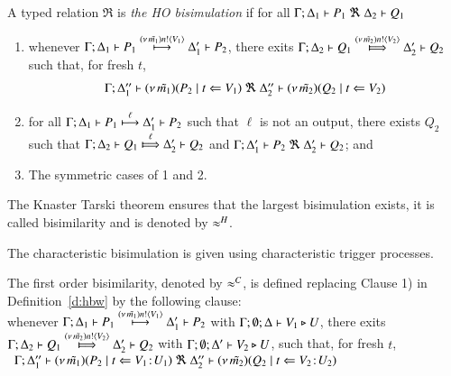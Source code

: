 \begin{definition}\rm
	\label{d:hbw}
A typed relation $\Re$ is {\em the HO bisimulation} if 
for all $\horel{\Gamma}{\Delta_1}{P_1}{\ \Re \ }{\Delta_2}{Q_1}$ 
\begin{enumerate}
\item 
whenever 
$\Gamma; \Delta_1 \vdash P_1 \stackrel{(\nu\, \tilde{m_1}) n ! \langle V_1 \rangle}{\longmapsto} \Delta_1' \vdash P_2$, there exits 
$\horel{\Gamma}{\Delta_2}{Q_1}{\Hby{\news{\tilde{m_2}} \bactout{n}{V_2}}}{\Delta_2'}{Q_2}$ such that, for fresh $t$, 
\[
\begin{array}{lrlll}
\Gamma; \Delta''_1  \vdash  {(\nu\, \tilde{m_1})(P_2 \;|\;t \Leftarrow V_1)}
\ \Re 
\ \Delta''_2 \vdash {(\nu\, \tilde{m_2})(Q_2 \;|\;t \Leftarrow V_2)}
\end{array}
\]
		\item	
for all $\Gamma; \Delta_1 \vdash P_1 \stackrel{\ell}{\longmapsto} \Delta_1' \vdash P_2$ such that 
$\ell$ is not an output, 
 there exists $Q_2$ such that 
$\horel{\Gamma}{\Delta_2}{Q_1}{\Hby{\ell}}{\Delta_2'}{Q_2}$
			and
			$\horel{\Gamma}{\Delta_1'}{P_2}{\ \Re \ }{\Delta_2'}{Q_2}$; and 

                      \item	The symmetric cases of 1 and 2.                
	\end{enumerate}
	The Knaster Tarski theorem ensures that the largest bisimulation exists,
	it is called bisimilarity and is denoted by $\approx^H$.
\end{definition}

\smallskip 

\noi The characteristic bisimulation is given using 
characteristic trigger processes. 

\smallskip 

\begin{definition}\rm
\label{d:fwb}
The first order bisimilarity, denoted by $\approx^C$, is defined replacing 
Clause 1) in Definition~\ref{d:hbw} by the following clause:\\[1mm]
whenever 
$\Gamma; \Delta_1 \vdash P_1 \stackrel{(\nu\, \tilde{m_1}) n ! \langle V_1 \rangle}{\longmapsto} \Delta_1' \vdash P_2$ with $\Gamma; \emptyset; \Delta \vdash V_1 \triangleright U$,  
there exits 
$\horel{\Gamma}{\Delta_2}{Q_1}{\Hby{\news{\tilde{m_2}}\bactout{n}{V_2}}}{\Delta_2'}{Q_2}$ with $\Gamma; \emptyset; \Delta' \vdash V_2 \triangleright U$,  
such that, for fresh $t$, \\[1mm]
$\begin{array}{lrlll}
\Gamma; \Delta''_1  \vdash  {(\nu\, \tilde{m_1})(P_2 \;|\;t \Leftarrow V_1 \! : \! U_1)}
\ \Re 
\ \Delta''_2 \vdash {(\nu\, \tilde{m_2})(Q_2 \;|\;t \Leftarrow V_2 \! : \! U_2)}
\end{array}
$
\end{definition}

